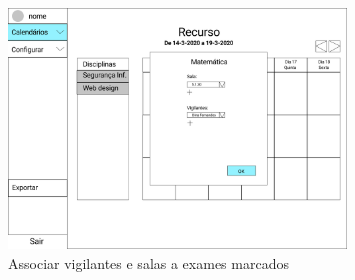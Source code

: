 \documentclass[11pt, twoside]{report}
\begin{document}
	\begin{figure}[H] 
	\centering 
	\includegraphics[width=0.8\textwidth,height=0.8\textheight,keepaspectratio]{image/prototipowireframes/popup}
	\caption{Associar vigilantes e salas a exames marcados}
	\label{interfacevigilantes}
\end{figure}
\end{document}
